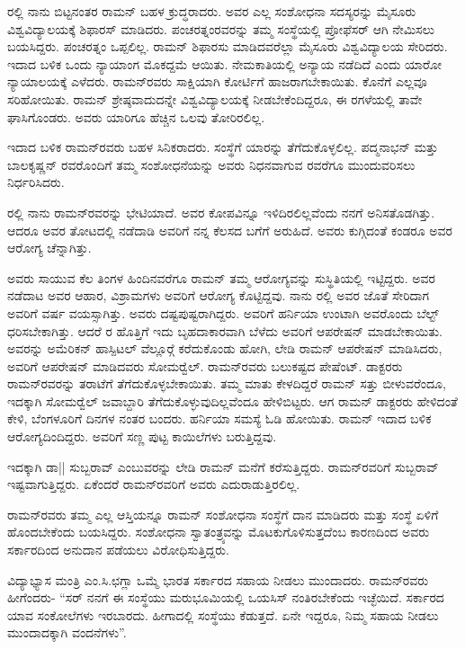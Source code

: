 ರಲ್ಲಿ ನಾನು ಬಿಟ್ಟನಂತರ ರಾಮನ್ ಬಹಳ ಕ್ರುದ್ಧರಾದರು. ಅವರ ಎಲ್ಲ ಸಂಶೋಧನಾ ಸದಸ್ಯರನ್ನು ಮೈಸೂರು ವಿಶ್ವವಿದ್ಯಾಲಯಕ್ಕೆ ಶಿಫಾರಸ್ ಮಾಡಿದರು. ಪಂಚರತ್ನಂರವರನ್ನು ತಮ್ಮ ಸಂಸ್ಥೆಯಲ್ಲಿ ಪ್ರೋಫೆಸರ್ ಆಗಿ ನೇಮಿಸಲು ಬಯಸಿದ್ದರು. ಪಂಚರತ್ನಂ ಒಪ್ಪಲಿಲ್ಲ. ರಾಮನ್ ಶಿಫಾರಸು ಮಾಡಿದವರೆಲ್ಲಾ ಮೈಸೂರು ವಿಶ್ವವಿದ್ಯಾಲಯ ಸೇರಿದರು. ಇದಾದ ಬಳಿಕ ಒಂದು ನ್ಯಾಯಾಂಗ ಮೊಕದ್ದಮೆ ಆಯಿತು. ನೇಮಕಾತಿಯಲ್ಲಿ ಅನ್ಯಾಯ ನಡೆದಿದೆ ಎಂದು ಯಾರೋ ನ್ಯಾಯಾಲಯಕ್ಕೆ ಎಳೆದರು. ರಾಮನ್‍ರವರು ಸಾಕ್ಷಿಯಾಗಿ ಕೋರ್ಟಿಗೆ ಹಾಜರಾಗಬೇಕಾಯಿತು. ಕೊನೆಗೆ ಎಲ್ಲವೂ ಸರಿಹೋಯಿತು. ರಾಮನ್ ಶ್ರೇಷ್ಠವಾದುದನ್ನೇ ವಿಶ್ವವಿದ್ಯಾಲಯಕ್ಕೆ ನೀಡಬೇಕೆಂದಿದ್ದರೂ, ಈ ರಗಳೆಯಲ್ಲಿ ತಾವೇ ಘಾಸಿಗೊಂಡರು. ಅವರು ಯಾರಿಗೂ ಹೆಚ್ಚಿನ ಒಲವು ತೋರಿರಲಿಲ್ಲ.

ಇದಾದ ಬಳಿಕ ರಾಮನ್‍ರವರು ಬಹಳ ಸಿನಿಕರಾದರು. ಸಂಸ್ಥೆಗೆ ಯಾರನ್ನು ತೆಗೆದುಕೊಳ್ಳಲಿಲ್ಲ. ಪದ್ಮನಾಭನ್ ಮತ್ತು ಬಾಲಕೃಷ್ಣನ್ ರವರೊಂದಿಗೆ ತಮ್ಮ ಸಂಶೋಧನೆಯನ್ನು ಅವರು ನಿಧನವಾಗುವ  ರವರೆಗೂ ಮುಂದುವರಿಸಲು ನಿರ್ಧರಿಸಿದರು.

ರಲ್ಲಿ ನಾನು ರಾಮನ್‍ರವರನ್ನು ಭೇಟಿಯಾದೆ. ಅವರ ಕೋಪವಿನ್ನೂ ಇಳಿದಿರಲಿಲ್ಲವೆಂದು ನನಗೆ ಅನಿಸತೊಡಗಿತ್ತು. ಆದರೂ ಅವರ ತೋಟದಲ್ಲಿ ನಡೆದಾಡಿ ಅವರಿಗೆ ನನ್ನ ಕೆಲಸದ ಬಗೆಗೆ ಅರುಹಿದೆ. ಅವರು ಕುಗ್ಗಿದಂತೆ ಕಂಡರೂ ಅವರ ಆರೋಗ್ಯ ಚೆನ್ನಾಗಿತ್ತು.

ಅವರು ಸಾಯುವ ಕೆಲ ತಿಂಗಳ ಹಿಂದಿನವರೆಗೂ ರಾಮನ್ ತಮ್ಮ ಆರೋಗ್ಯವನ್ನು ಸುಸ್ಥಿತಿಯಲ್ಲಿ ಇಟ್ಟಿದ್ದರು. ಅವರ ನಡೆದಾಟ ಅವರ ಆಹಾರ, ವಿಶ್ರಾಮಗಳು ಅವರಿಗೆ ಆರೋಗ್ಯ ಕೊಟ್ಟಿದ್ದವು. ನಾನು ರಲ್ಲಿ ಅವರ ಜೊತೆ ಸೇರಿದಾಗ ಅವರಿಗೆ  ವರ್ಷ ವಯಸ್ಸಾಗಿತ್ತು. ಅವರು ದಷ್ಟಪುಷ್ಟರಾಗಿದ್ದರು. ಅವರಿಗೆ ಹರ್ನಿಯಾ ಉಂಟಾಗಿ ಅವರೊಂದು ಬೆಲ್ಟ್ ಧರಿಸಬೇಕಾಗಿತ್ತು. ಆದರೆ ರ ಹೊತ್ತಿಗೆ ಇದು ಬೃಹದಾಕಾರವಾಗಿ ಬೆಳೆದು ಅವರಿಗೆ ಆಪರೇಷನ್ ಮಾಡಬೇಕಾಯಿತು. ಅವರನ್ನು ಅಮೆರಿಕನ್ ಹಾಸ್ಪಿಟಲ್ ವೆಲ್ಲೂರ್‍ಗೆ ಕರೆದುಕೊಂಡು ಹೋಗಿ, ಲೇಡಿ ರಾಮನ್ ಆಪರೇಷನ್ ಮಾಡಿಸಿದರು, ಅವರಿಗೆ ಆಪರೇಷನ್ ಮಾಡಿದವರು ಸೋಮರ್‍ವೆಲ್. ರಾಮನ್‍ರವರು ಬಲುಕಷ್ಟದ ಪೇಷೆಂಟ್. ಡಾಕ್ಟರರು ರಾಮನ್‍ರವರನ್ನು ತರಾಟೆಗೆ ತೆಗೆದುಕೊಳ್ಳಬೇಕಾಯಿತು. ತಮ್ಮ ಮಾತು ಕೇಳದಿದ್ದರೆ ರಾಮನ್ ಸತ್ತು ಬೀಳುವರೆಂದೂ, ಇದಕ್ಕಾಗಿ ಸೋಮರ್‍ವೆಲ್ ಜವಾಬ್ದಾರಿ ತೆಗೆದುಕೊಳ್ಳುವುದಿಲ್ಲವೆಂದೂ ಹೇಳಿಬಿಟ್ಟರು. ಆಗ ರಾಮನ್ ಡಾಕ್ಟರರು ಹೇಳಿದಂತೆ ಕೇಳಿ, ಬೆಂಗಳೂರಿಗೆ  ದಿನಗಳ ನಂತರ ಬಂದರು. ಹರ್ನಿಯಾ ಸಮಸ್ಯೆ ಓಡಿ ಹೋಯಿತು. ರಾಮನ್ ಇದಾದ ಬಳಿಕ ಆರೋಗ್ಯದಿಂದಿದ್ದರು. ಅವರಿಗೆ ಸಣ್ಣ ಪುಟ್ಟ ಕಾಯಿಲೆಗಳು ಬರುತ್ತಿದ್ದವು.

ಇದಕ್ಕಾಗಿ ಡಾ|| ಸುಬ್ಬರಾವ್ ಎಂಬುವರನ್ನು ಲೇಡಿ ರಾಮನ್ ಮನೆಗೆ ಕರೆಸುತ್ತಿದ್ದರು. ರಾಮನ್‍ರವರಿಗೆ ಸುಬ್ಬರಾವ್ ಇಷ್ಟವಾಗುತ್ತಿದ್ದರು. ಏಕೆಂದರೆ ರಾಮನ್‍ರವರಿಗೆ ಅವರು ಎದುರಾಡುತ್ತಿರಲಿಲ್ಲ.



ರಾಮನ್‍ರವರು ತಮ್ಮ ಎಲ್ಲ ಆಸ್ತಿಯನ್ನೂ ರಾಮನ್ ಸಂಶೋಧನಾ ಸಂಸ್ಥೆಗೆ ದಾನ ಮಾಡಿದರು ಮತ್ತು ಸಂಸ್ಥೆ ಏಳಿಗೆ ಹೊಂದಬೇಕೆಂದು ಬಯಸಿದ್ದರು. ಸಂಶೋಧನಾ ಸ್ವಾತಂತ್ರ್ಯವನ್ನು ಮೊಟಕುಗೊಳಿಸುತ್ತದೆಂಬ ಕಾರಣದಿಂದ ಅವರು ಸರ್ಕಾರದಿಂದ ಅನುದಾನ ಪಡೆಯಲು ವಿರೋಧಿಸುತ್ತಿದ್ದರು.

ವಿದ್ಯಾಭ್ಯಾಸ ಮಂತ್ರಿ ಎಂ.ಸಿ.ಛಗ್ಲಾ ಒಮ್ಮೆ ಭಾರತ ಸರ್ಕಾರದ ಸಹಾಯ ನೀಡಲು ಮುಂದಾದರು. ರಾಮನ್‍ರವರು ಹೀಗೆಂದರು- “ಸರ್ ನನಗೆ ಈ ಸಂಸ್ಥೆಯು ಮರುಭೂಮಿಯಲ್ಲಿ ಒಯಸಿಸ್ ನಂತಿರಬೇಕೆಂದು ಇಚ್ಛೆಯಿದೆ. ಸರ್ಕಾರದ ಯಾವ ಸಂಕೋಲೆಗಳು ಇರಬಾರದು. ಹೀಗಾದಲ್ಲಿ ಸಂಸ್ಥೆಯು ಕೆಡುತ್ತದೆ. ಏನೇ ಇದ್ದರೂ, ನಿಮ್ಮ ಸಹಾಯ ನೀಡಲು ಮುಂದಾದಕ್ಕಾಗಿ ವಂದನೆಗಳು”.

